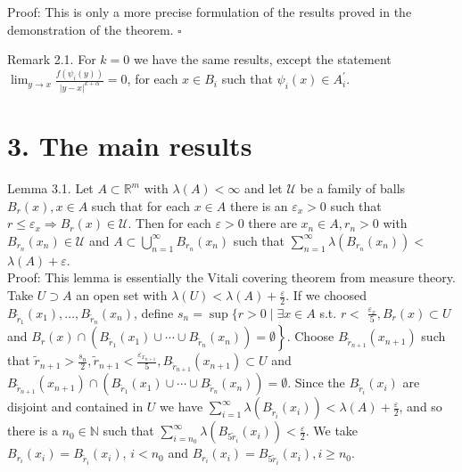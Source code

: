 \documentclass[10pt]{article}
\begin{document}
Proof: This is only a more precise formulation of the results proved in the demonstration of the theorem. \(\square\)

Remark 2.1. For $k=0$ we have the same results, except the statement $\lim _{y \rightarrow x} \frac{f\left(\psi_{i}(y)\right)}{|y-x|^{k+\alpha}}=0$, for each $x \in B_{i}$ such that $\psi_{i}(x) \in A_{i}^{\prime}$.

\section*{3. The main results}
Lemma 3.1. Let $A \subset \mathbb{R}^{m}$ with $\lambda(A)<\infty$ and let $\mathcal{U}$ be a family of balls $B_{r}(x), x \in A$ such that for each $x \in A$ there is an $\varepsilon_{x}>0$ such that $r \leq \varepsilon_{x} \Rightarrow B_{r}(x) \in \mathcal{U}$. Then for each $\varepsilon>0$ there are $x_{n} \in A, r_{n}>0$ with $B_{r_{n}}\left(x_{n}\right) \in \mathcal{U}$ and $A \subset \bigcup_{n=1}^{\infty} B_{r_{n}}\left(x_{n}\right)$ such that $\sum_{n=1}^{\infty} \lambda\left(B_{r_{n}}\left(x_{n}\right)\right)<$ $\lambda(A)+\varepsilon$.\\
Proof: This lemma is essentially the Vitali covering theorem from measure theory. Take $U \supset A$ an open set with $\lambda(U)<\lambda(A)+\frac{\varepsilon}{2}$. If we choosed $B_{\tilde{r}_{1}}\left(x_{1}\right), \ldots, B_{\tilde{r}_{n}}\left(x_{n}\right)$, define $s_{n}=\sup \{r>0 \mid \exists x \in A$ s.t. $r<$ $\frac{\varepsilon_{x}}{5}, B_{r}(x) \subset U$ and $\left.B_{r}(x) \cap\left(B_{\tilde{r}_{1}}\left(x_{1}\right) \cup \cdots \cup B_{\tilde{r}_{n}}\left(x_{n}\right)\right)=\emptyset\right\}$. Choose $B_{\tilde{r}_{n+1}}\left(x_{n+1}\right)$ such that $\tilde{r}_{n+1}>\frac{s_{n}}{2}, \tilde{r}_{n+1}<\frac{\varepsilon_{x_{n+1}}}{5}, B_{\tilde{r}_{n+1}}\left(x_{n+1}\right) \subset U$ and $B_{\tilde{r}_{n+1}}\left(x_{n+1}\right) \cap\left(B_{\tilde{r}_{1}}\left(x_{1}\right) \cup \cdots \cup B_{\tilde{r}_{n}}\left(x_{n}\right)\right)=\emptyset$. Since the $B_{\tilde{r}_{i}}\left(x_{i}\right)$ are disjoint and contained in $U$ we have $\sum_{i=1}^{\infty} \lambda\left(B_{\tilde{r}_{i}}\left(x_{i}\right)\right)<\lambda(A)+\frac{\varepsilon}{2}$, and so there is a $n_{0} \in \mathbb{N}$ such that $\sum_{i=n_{0}}^{\infty} \lambda\left(B_{5 \tilde{r}_{i}}\left(x_{i}\right)\right)<\frac{\varepsilon}{2}$. We take $B_{r_{i}}\left(x_{i}\right)=B_{\tilde{r}_{i}}\left(x_{i}\right)$, $i<n_{0}$ and $B_{r_{i}}\left(x_{i}\right)=B_{5 \tilde{r}_{i}}\left(x_{i}\right), i \geq n_{0}$.
\end{document}
